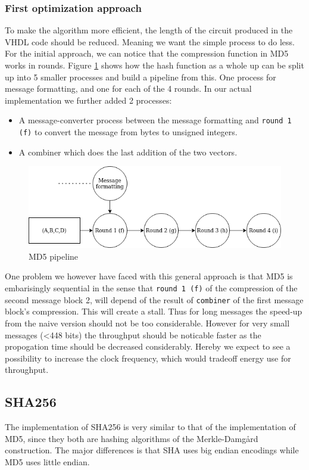 \documentclass[a4paper]{article}
\begin{document}
\subsubsection{First optimization approach}
\label{sec:org7ae45f1}
To make the algorithm more efficient, the length of the circuit produced in the VHDL code should be reduced. Meaning we want the simple process to do less. For the initial approach, we can notice that the compression function in MD5 works in rounds. Figure \ref{fig:MD5opt1} shows how the hash function as a whole up can be split up into 5 smaller processes and build a pipeline from this. One process for message formatting, and one for each of the 4 rounds. In our actual implementation we further added 2 processes:
\begin{itemize}
\item A message-converter process between the message formatting and \texttt{round 1 (f)} to convert the message from bytes to unsigned integers.
\item A combiner which does the last addition of the two vectors.
\end{itemize}

\begin{figure}[H]
\centering
\includegraphics[width=.9\linewidth]{./Implementation/md5.png}
\caption{\label{fig:MD5opt1}MD5 pipeline}
\end{figure}
One problem we however have faced with this general approach is that MD5 is embarisingly sequential in the sense that \texttt{round 1 (f)} of the compression of the second message block 2, will depend of the result of \texttt{combiner} of the first message block's compression. This will create a stall. Thus for long messages the speed-up from the naive version should not be too considerable. However for very small messages (<448 bits) the throughput should be noticable faster as the propogation time should be decreased considerably. Hereby we expect to see a possibility to increase the clock frequency, which would tradeoff energy use for throughput.
\subsection{SHA256}
\label{sec:org8c13fc9}
The implementation of SHA256 is very similar to that of the implementation of MD5,
since they both are hashing algorithms of the Merkle-Damgård construction.
The major differences is that SHA uses big endian encodings while MD5 uses little endian.
\end{document}
